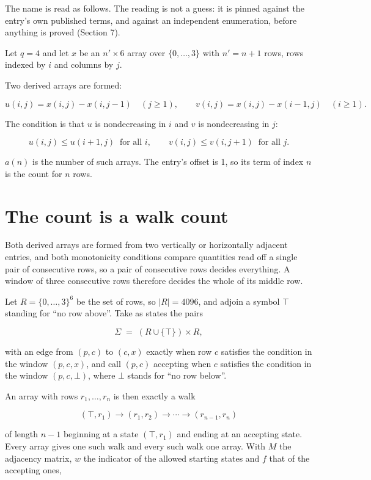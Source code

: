 \documentclass[11pt]{article}
\theoremstyle{definition}
\begin{document}
The name is read as follows. The reading is not a guess: it is pinned against the entry's own published terms, and against an independent enumeration, before anything is proved (Section 7).

Let $q = 4$ and let $x$ be an $n' \times 6$ array over $\{0,\dots,3\}$ with $n' = n + 1$ rows, rows indexed by $i$ and columns by $j$.

Two derived arrays are formed:

\[u(i,j) = x(i,j) - x(i,j{-}1)\quad (j \ge 1), \qquad v(i,j) = x(i,j) - x(i{-}1,j)\quad (i \ge 1).\]

The condition is that $u$ is nondecreasing in $i$ and $v$ is nondecreasing in $j$:

\[u(i,j) \le u(i{+}1,j) \ \text{ for all } i, \qquad v(i,j) \le v(i,j{+}1) \ \text{ for all } j.\]

$a(n)$ is the number of such arrays. The entry's offset is 1, so its term of index $n$ is the count for $n$ rows.

\section{The count is a walk count}

Both derived arrays are formed from two vertically or horizontally adjacent entries, and both monotonicity conditions compare quantities read off a single pair of consecutive rows, so a pair of consecutive rows decides everything. A window of three consecutive rows therefore decides the whole of its middle row.

Let $R = \{0,\dots,3\}^{6}$ be the set of rows, so $|R| = 4096$, and adjoin a symbol $\top$ standing for ``no row above''. Take as states the pairs

\[\Sigma \;=\; (R \cup \{\top\}) \times R,\]

with an edge from $(p,c)$ to $(c,x)$ exactly when row $c$ satisfies the condition in the window $(p,c,x)$, and call $(p,c)$ accepting when $c$ satisfies the condition in the window $(p,c,\bot)$, where $\bot$ stands for ``no row below''.

An array with rows $r_1,\dots,r_n$ is then exactly a walk

\[(\top,r_1) \to (r_1,r_2) \to \cdots \to (r_{n-1},r_n)\]

of length $n-1$ beginning at a state $(\top,r_1)$ and ending at an accepting state. Every array gives one such walk and every such walk one array. With $M$ the adjacency matrix, $w$ the indicator of the allowed starting states and $f$ that of the accepting ones,
\end{document}
